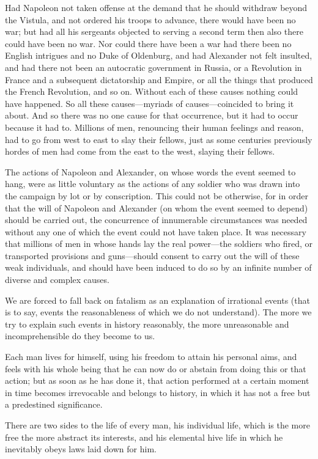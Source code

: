 Had Napoleon not taken offense at the demand that he should
withdraw beyond the Vistula, and not ordered his troops to
advance, there would have been no war; but had all his sergeants
objected to serving a second term then also there could have been
no war. Nor could there have been a war had there been no English
intrigues and no Duke of Oldenburg, and had Alexander not felt
insulted, and had there not been an autocratic government in
Russia, or a Revolution in France and a subsequent dictatorship
and Empire, or all the things that produced the French
Revolution, and so on. Without each of these causes nothing could
have happened. So all these causes---myriads of
causes---coincided to bring it about. And so there was no one
cause for that occurrence, but it had to occur because it had
to. Millions of men, renouncing their human feelings and reason,
had to go from west to east to slay their fellows, just as some
centuries previously hordes of men had come from the east to the
west, slaying their fellows.

The actions of Napoleon and Alexander, on whose words the event
seemed to hang, were as little voluntary as the actions of any
soldier who was drawn into the campaign by lot or by
conscription. This could not be otherwise, for in order that the
will of Napoleon and Alexander (on whom the event seemed to
depend) should be carried out, the concurrence of innumerable
circumstances was needed without any one of which the event could
not have taken place. It was necessary that millions of men in
whose hands lay the real power---the soldiers who fired, or
transported provisions and guns---should consent to carry out the
will of these weak individuals, and should have been induced to
do so by an infinite number of diverse and complex causes.

We are forced to fall back on fatalism as an explanation of
irrational events (that is to say, events the reasonableness of
which we do not understand). The more we try to explain such
events in history reasonably, the more unreasonable and
incomprehensible do they become to us.

Each man lives for himself, using his freedom to attain his
personal aims, and feels with his whole being that he can now do
or abstain from doing this or that action; but as soon as he has
done it, that action performed at a certain moment in time
becomes irrevocable and belongs to history, in which it has not a
free but a predestined significance.

There are two sides to the life of every man, his individual
life, which is the more free the more abstract its interests, and
his elemental hive life in which he inevitably obeys laws laid
down for him.

